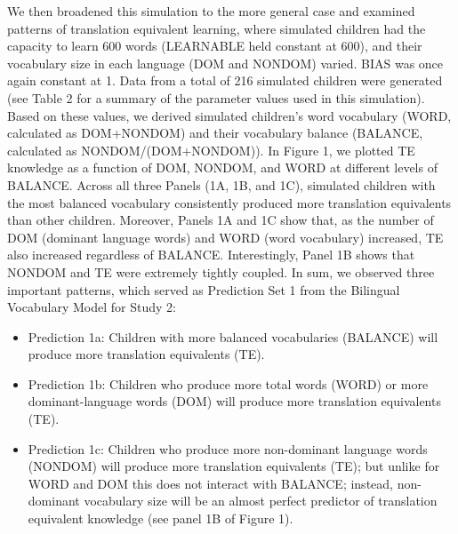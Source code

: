 \documentclass[
  english,
  ,man,floatsintext]{apa6}
\providecommand{\tightlist}{%
  \setlength{\itemsep}{0pt}\setlength{\parskip}{0pt}}
\begin{document}
We then broadened this simulation to the more general case and examined patterns of translation equivalent learning, where simulated children had the capacity to learn 600 words (LEARNABLE held constant at 600), and their vocabulary size in each language (DOM and NONDOM) varied. BIAS was once again constant at 1. Data from a total of 216 simulated children were generated (see Table 2 for a summary of the parameter values used in this simulation). Based on these values, we derived simulated children's word vocabulary (WORD, calculated as DOM+NONDOM) and their vocabulary balance (BALANCE, calculated as NONDOM/(DOM+NONDOM)). In Figure 1, we plotted TE knowledge as a function of DOM, NONDOM, and WORD at different levels of BALANCE. Across all three Panels (1A, 1B, and 1C), simulated children with the most balanced vocabulary consistently produced more translation equivalents than other children. Moreover, Panels 1A and 1C show that, as the number of DOM (dominant language words) and WORD (word vocabulary) increased, TE also increased regardless of BALANCE. Interestingly, Panel 1B shows that NONDOM and TE were extremely tightly coupled. In sum, we observed three important patterns, which served as Prediction Set 1 from the Bilingual Vocabulary Model for Study 2:

\begin{itemize}
\tightlist
\item
  Prediction 1a: Children with more balanced vocabularies (BALANCE) will produce more translation equivalents (TE).
\item
  Prediction 1b: Children who produce more total words (WORD) or more dominant-language words (DOM) will produce more translation equivalents (TE).
\item
  Prediction 1c: Children who produce more non-dominant language words (NONDOM) will produce more translation equivalents (TE); but unlike for WORD and DOM this does not interact with BALANCE; instead, non-dominant vocabulary size will be an almost perfect predictor of translation equivalent knowledge (see panel 1B of Figure 1).
\end{itemize}
\end{document}
